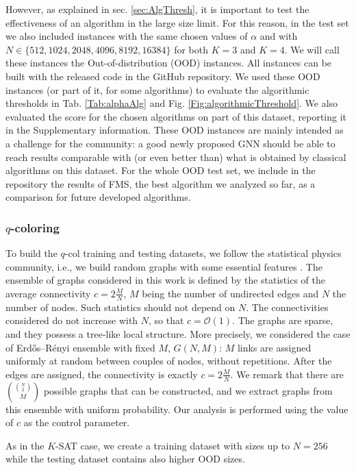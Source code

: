 \documentclass{article}
\begin{document}
However, as explained in sec. \ref{sec:AlgThresh}, it is important to test the effectiveness of an algorithm in the large size limit. For this reason, in the test set we also included instances with the same chosen values of $\alpha$ and with $N \in \{512, 1024, 2048, 4096, 8192, 16384\}$ for both $K=3$ and $K=4$. We will call these instances the Out-of-distribution (OOD) instances. All instances can be built with the released code in the GitHub repository.
We used these OOD instances (or part of it, for some algorithms) to evaluate the algorithmic thresholds in Tab. \ref{Tab:alphaAlg} and Fig. \ref{Fig:algorithmicThreshold}. We also evaluated the score for the chosen algorithms on part of this dataset, reporting it in the Supplementary information.
These OOD instances are mainly intended as a challenge for the community: a good newly proposed GNN should be able to reach results comparable with (or even better than) what is obtained by classical algorithms on this dataset. For the whole OOD test set, we include in the repository the results of FMS, the best algorithm we analyzed so far, as a comparison for future developed algorithms.


\subsubsection{$q$-coloring}
To build the $q$-col training and testing datasets, we follow the statistical physics community, i.e., we build random graphs with some essential features \cite{zdeborova2007phase}. The ensemble of graphs considered in this work is defined by the statistics of the average connectivity $c=2\frac{M}{N}$, $M$ being the number of undirected edges and $N$ the number of nodes. Such statistics should not depend on $N$. The connectivities considered do not increase with $N$, so that $c=\mathcal{O}(1)$. The graphs are sparse, and they possess a tree-like local structure. More precisely,  we considered the case of Erdős–Rényi ensemble with fixed $M$, $G(N,M)$: $M$ links are assigned uniformly at random between couples of nodes, without repetitions. After the edges are assigned, the connectivity is exactly $c=2\frac{M}{N}$. We remark that there are $\binom{\binom{N}{2}}{M}$ possible graphs that can be constructed, and we extract graphs from this ensemble with uniform probability. Our analysis is performed using the value of $c$ as the control parameter.

As in the $K$-SAT case, we create a training dataset with sizes up to $N=256$ while the testing dataset contains also higher OOD sizes.
\end{document}
